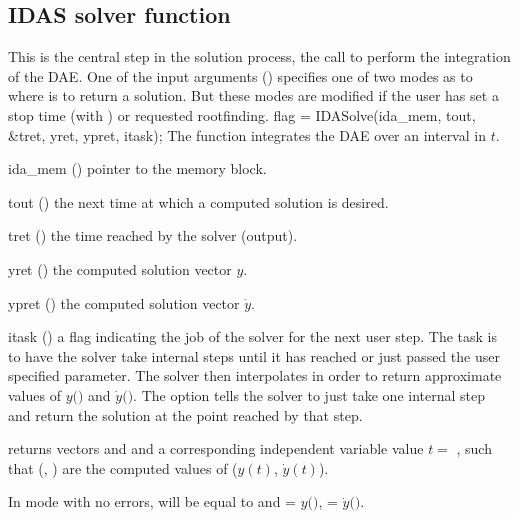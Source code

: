 {%

\subsection{IDAS solver function}\label{sss:idasolve}
%
This is the central step in the solution process, the call to perform the
integration of the DAE.  One of the input arguments ()
specifies one of two modes as to where {\idas} is to return a solution.
But these modes are modified if the user has set a stop time (with
) or requested rootfinding.
%
{
  flag = IDASolve(ida\_mem, tout, \&tret, yret, ypret, itask);
}
{
  The function  integrates the DAE over an interval in $t$.
}
{
  \begin{args}
  \item[ida\_mem] ()
    pointer to the {\idas} memory block.
  \item[tout] ()
    the next time at which a computed solution is desired.
  \item[tret] ()
    the time reached by the solver (output).
  \item[yret] ()
    the computed solution vector $y$.
  \item[ypret] ()
    the computed solution vector $\dot{y}$.
  \item[itask] ()
    a flag indicating the job of the solver for the next user step.
    The  task is to have the solver take internal steps until
    it has reached or just passed the user specified 
    parameter. The solver then interpolates in order to
    return approximate values of $y($$)$ and $\dot{y}($$)$.
    The  option tells the solver to just take one internal step
    and return the solution at the point reached by that step.
  \end{args}
}
{
   returns vectors  and  and a
  corresponding independent variable value $t =$ , such that (,
  ) are the computed values of ($y(t)$, $\dot{y}(t)$).

  In  mode with no errors,  will be equal to 
  and  = $y($$)$,  = $\dot{y}($$)$.

}}
